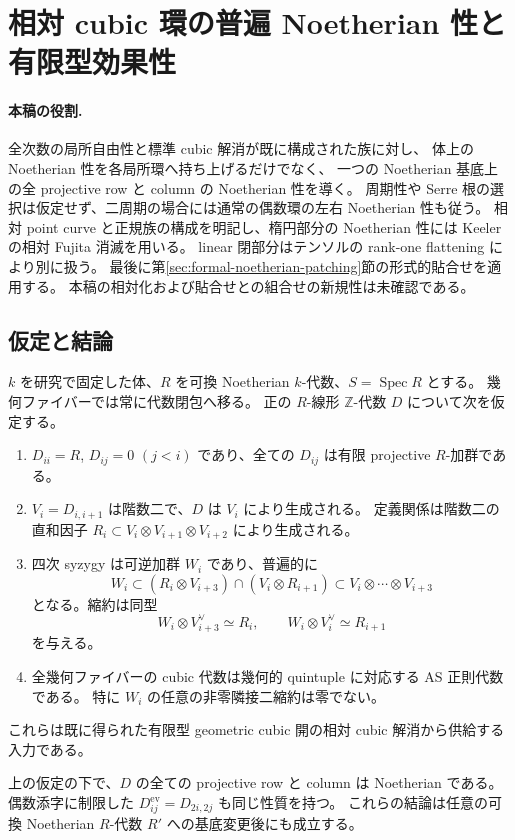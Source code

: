 \section{相対 cubic 環の普遍 Noetherian 性と有限型効果性}
\label{sec:relative-cubic-noetherian}

\paragraph{本稿の役割.}
全次数の局所自由性と標準 cubic 解消が既に構成された族に対し、
体上の Noetherian 性を各局所環へ持ち上げるだけでなく、
一つの Noetherian 基底上の全 projective row と column の Noetherian 性を導く。
周期性や Serre 根の選択は仮定せず、二周期の場合には通常の偶数環の左右 Noetherian 性も従う。
相対 point curve と正規族の構成を明記し、楕円部分の Noetherian 性には
Keeler の相対 Fujita 消滅を用いる。
linear 閉部分はテンソルの rank-one flattening により別に扱う。
最後に第\ref{sec:formal-noetherian-patching}節の形式的貼合せを適用する。
本稿の相対化および貼合せとの組合せの新規性は未確認である。

\subsection{仮定と結論}

$k$ を研究で固定した体、$R$ を可換 Noetherian $k$-代数、$S=\operatorname{Spec} R$ とする。
幾何ファイバーでは常に代数閉包へ移る。
正の $R$-線形 $\mathbb Z$-代数 $D$ について次を仮定する。
\begin{enumerate}
\item $D_{ii}=R$, $D_{ij}=0$ $(j<i)$ であり、全ての $D_{ij}$ は有限 projective $R$-加群である。
\item $V_i=D_{i,i+1}$ は階数二で、$D$ は $V_i$ により生成される。
  定義関係は階数二の直和因子
  $R_i\subset V_i\otimes V_{i+1}\otimes V_{i+2}$ により生成される。
\item 四次 syzygy は可逆加群 $W_i$ であり、普遍的に
  \[
  W_i\subset (R_i\otimes V_{i+3})\cap(V_i\otimes R_{i+1})
  \subset V_i\otimes\cdots\otimes V_{i+3}
  \]
  となる。縮約は同型
  \begin{equation}\label{noeth-eq:contraction}
  W_i\otimes V_{i+3}^{\vee}\simeq R_i,
  \qquad W_i\otimes V_i^{\vee}\simeq R_{i+1}
  \end{equation}
  を与える。
\item 全幾何ファイバーの cubic 代数は幾何的 quintuple に対応する AS 正則代数である。
  特に $W_i$ の任意の非零隣接二縮約は零でない。
\end{enumerate}
これらは既に得られた有限型 geometric cubic 開の相対 cubic 解消から供給する入力である。
\begin{theorem}
\label{thm:relative-geometric-cubic-noetherian}
上の仮定の下で、$D$ の全ての projective row と column は Noetherian である。
偶数添字に制限した $D^{\mathrm{ev}}_{ij}=D_{2i,2j}$ も同じ性質を持つ。
これらの結論は任意の可換 Noetherian $R$-代数 $R'$ への基底変更後にも成立する。
\end{theorem}

